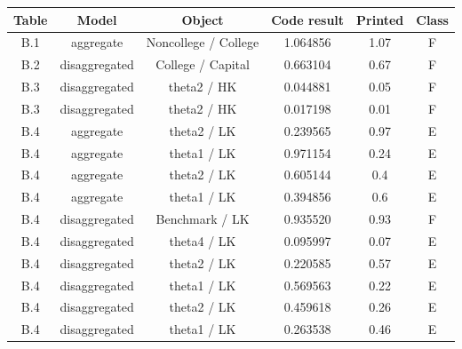 \begin{table}[!ht]
\setlength\tabcolsep{0.425em}
\setlength\aboverulesep{0pt}
\setlength\belowrulesep{0.2em}
\centering
\begin{threeparttable}
\begin{tabular}{cccccc}
\toprule[0.1em]
Table & Model & Object & Code result & Printed & Class \\[0.2em]
\midrule[0.075em]
B.1 & aggregate & Noncollege / College & 1.064856 & 1.07 & F \\[0.2em]
B.2 & disaggregated & College / Capital & 0.663104 & 0.67 & F \\[0.2em]
B.3 & disaggregated & theta2 / HK & 0.044881 & 0.05 & F \\[0.2em]
B.3 & disaggregated & theta2 / HK & 0.017198 & 0.01 & F \\[0.2em]
B.4 & aggregate & theta2 / LK & 0.239565 & 0.97 & E \\[0.2em]
B.4 & aggregate & theta1 / LK & 0.971154 & 0.24 & E \\[0.2em]
B.4 & aggregate & theta2 / LK & 0.605144 & 0.4 & E \\[0.2em]
B.4 & aggregate & theta1 / LK & 0.394856 & 0.6 & E \\[0.2em]
B.4 & disaggregated & Benchmark / LK & 0.935520 & 0.93 & F \\[0.2em]
B.4 & disaggregated & theta4 / LK & 0.095997 & 0.07 & E \\[0.2em]
B.4 & disaggregated & theta2 / LK & 0.220585 & 0.57 & E \\[0.2em]
B.4 & disaggregated & theta1 / LK & 0.569563 & 0.22 & E \\[0.2em]
B.4 & disaggregated & theta2 / LK & 0.459618 & 0.26 & E \\[0.2em]
B.4 & disaggregated & theta1 / LK & 0.263538 & 0.46 & E \\[0.2em]
\bottomrule[0.1em]
\end{tabular}
\end{threeparttable}
\end{table}

